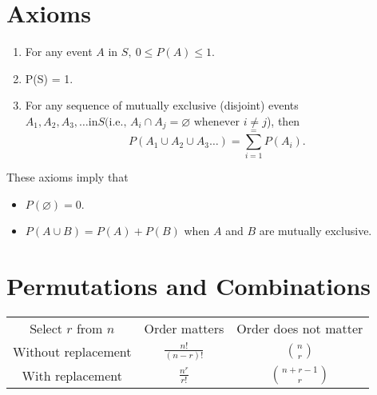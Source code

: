 \documentclass{article}
\begin{document}
\section*{Axioms}
\begin{enumerate}
    \item For any event \(A\) in \(S,\ 0 \leq P(A) \leq1\).
    \item P(S) = 1.
    \item For any sequence of mutually exclusive (disjoint) events \(A_1, A_2, A_3, \dots \text{in} S (\text{i.e., } A_i \cap A_j = \varnothing \text{ whenever } i \neq j\)), then
          \begin{equation*}
              P(A_1 \cup A_2 \cup A_3 \dots) = \sum_{i=1}^{=}P(A_i).
          \end{equation*}
\end{enumerate}

These axioms imply that
\begin{itemize}
    \item \(P(\varnothing) = 0.\)
    \item \(P(A \cup B) = P(A) + P(B)\) when \(A\) and \(B\) are mutually exclusive.
\end{itemize}

\section*{Permutations and Combinations}
\begin{tabular}{c|c|c}
    \hline
    Select \(r\) from \(n\) & Order matters         & Order does not matter \\
    Without replacement     & \(\frac{n!}{(n-r)!}\) & \(\binom{n}{r}\)      \\
    With replacement        & \(\frac{n^r}{r!}\)    & \(\binom{n+r-1}{r}\)  \\
\end{tabular}
\end{document}
